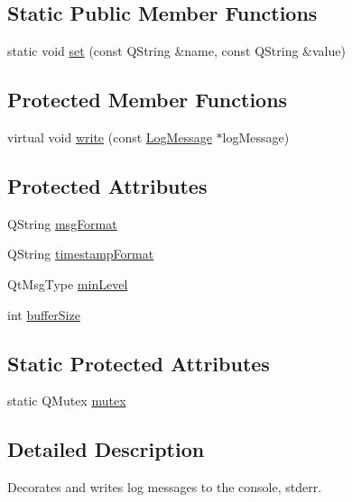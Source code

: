 \subsection*{Static Public Member Functions}
\begin{DoxyCompactItemize}
\item 
static void \mbox{\hyperlink{classstefanfrings_1_1_logger_aeec74ca028bceb107a2337c5f6090432}{set}} (const Q\+String \&name, const Q\+String \&value)
\end{DoxyCompactItemize}
\subsection*{Protected Member Functions}
\begin{DoxyCompactItemize}
\item 
virtual void \mbox{\hyperlink{classstefanfrings_1_1_logger_a69f50fe67efaa254ee219f6de384e9fa}{write}} (const \mbox{\hyperlink{classstefanfrings_1_1_log_message}{Log\+Message}} $\ast$log\+Message)
\end{DoxyCompactItemize}
\subsection*{Protected Attributes}
\begin{DoxyCompactItemize}
\item 
Q\+String \mbox{\hyperlink{classstefanfrings_1_1_logger_ab7dada738f69e822329edd76889bb758}{msg\+Format}}
\item 
Q\+String \mbox{\hyperlink{classstefanfrings_1_1_logger_a04eed4523912a75a31d75589f9eb81db}{timestamp\+Format}}
\item 
Qt\+Msg\+Type \mbox{\hyperlink{classstefanfrings_1_1_logger_a032b8dabe616327d58e97b1a5c853f86}{min\+Level}}
\item 
int \mbox{\hyperlink{classstefanfrings_1_1_logger_a9e6f76da976e3f09962c7613ad7aad8a}{buffer\+Size}}
\end{DoxyCompactItemize}
\subsection*{Static Protected Attributes}
\begin{DoxyCompactItemize}
\item 
static Q\+Mutex \mbox{\hyperlink{classstefanfrings_1_1_logger_a724e09b39b88c5a880f2405a260949cb}{mutex}}
\end{DoxyCompactItemize}


\subsection{Detailed Description}
Decorates and writes log messages to the console, stderr. 

